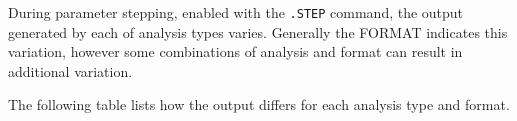 

During parameter stepping, enabled with the \texttt{.STEP} command, the
output generated by each of analysis types varies.  Generally the FORMAT
indicates this variation, however some combinations of analysis and
format can result in additional variation.

The following table lists how the output differs for each analysis type
and format.

